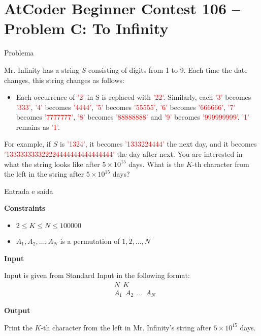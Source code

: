 \section{AtCoder Beginner Contest 106 -- Problem C: To Infinity}

\begin{frame}[fragile]{Problema}

Mr. Infinity has a string $S$ consisting of digits from 1 to 9. Each time the date changes, this 
string changes as follows:

\begin{itemize}
    \item Each occurrence of \textcolor{red}{'2'} in S is replaced with \textcolor{red}{'22'}. Similarly, each \textcolor{red}{'3'} becomes \textcolor{red}{'333'}, \textcolor{red}{'4'} becomes \textcolor{red}{'4444'}, \textcolor{red}{'5'} becomes \textcolor{red}{'55555'}, \textcolor{red}{'6'} becomes \textcolor{red}{'666666'}, \textcolor{red}{'7'} becomes \textcolor{red}{'7777777'}, \textcolor{red}{'8'} becomes \textcolor{red}{'88888888'} and \textcolor{red}{'9'} becomes \textcolor{red}{'999999999'}. \textcolor{red}{'1'} remains as \textcolor{red}{'1'}.
\end{itemize}

For example, if $S$ is \textcolor{red}{'1324'}, it becomes \textcolor{red}{'1333224444'} the next day, and it becomes \textcolor{red}{'133333333322224444444444444444'} the day after next. You are interested in what the string looks like after $5\times 10^{15}$ days. What is the $K$-th character 
from the left in the string after $5\times 10^{15}$ days?

\end{frame}

\begin{frame}[fragile]{Entrada e saída}

\textbf{Constraints}

\begin{itemize}
    \item $2\leq K\leq N\leq 100000$
    \item $A_1, A_2, \ldots, A_N$ is a permutation of $1, 2, \ldots, N$
\end{itemize}

\textbf{Input}

Input is given from Standard Input in the following format:
\begin{align*}
&N\ \ K \\
&A_1\ \ A_2\ \ \ldots\ \ A_N
\end{align*}

\textbf{Output}

Print the $K$-th character from the left in Mr. Infinity's string after $5\times 10^{15}$ days.

\end{frame}

